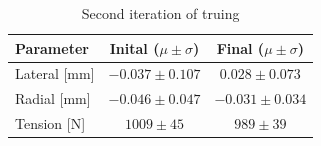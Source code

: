 \documentclass[journal]{IEEEtran}
\begin{document}
\begin{table}[!t]
\caption{Second iteration of truing}
\label{tbl:exp3}
\centering
\begin{tabular}{| l | c | c |}
    \hline
    Parameter & Inital ($\mu \pm \sigma$) & Final ($\mu \pm \sigma$)\\ \hline
    Lateral [mm] & $-0.037\pm0.107$ &$0.028\pm 0.073$ \\ \hline 
    Radial [mm] &$-0.046\pm0.047$& $-0.031\pm0.034$ \\ \hline 
    Tension [N] &$1009\pm45$& $989\pm39$ \\ \hline 
\end{tabular}
\end{table}






%
%

\end{document}
